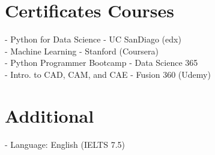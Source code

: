 \documentclass[margin, 10pt]{res} %
\begin{document}
\begin{resume}

\section{Certificates Courses \\}
\begin{list} 
    
    - Python for Data Science -  UC SanDiago (edx)\\
    - Machine Learning - Stanford (Coursera) \\
    - Python Programmer Bootcamp -  Data Science 365 \\
    - Intro. to CAD, CAM, and CAE -  Fusion 360 (Udemy)\\

\end{list}

\section{Additional \\}
\begin{list} 
    
    - Language: English (IELTS 7.5)\\



\end{list}



\end{resume}
\end{document}
